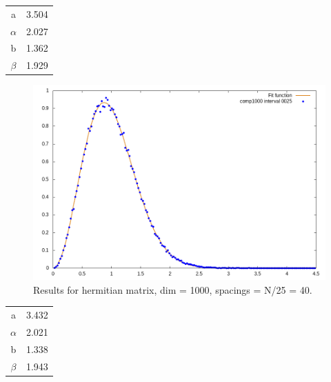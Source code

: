 \documentclass[12pt, a4paper, notitlepage]{report}
\begin{document}
\begin{table}[H]
	\centering
	\begin{tabular}{|c|c|}
		
		\hline
		
		a			& 3.504	\\
		$\alpha$	& 2.027	\\
		b			& 1.362	\\
		$\beta$		& 1.929	\\
		
		\hline
		
	\end{tabular}
\end{table}

\newpage

\begin{figure}[H]
	\centering
	\includegraphics[scale=0.6]{./Comp_1000/hist_interval_0040_fit.png} 
	\caption{Results for hermitian matrix, dim = 1000, spacings = N/25 = 40.}
	\label{figure_lambdas}
\end{figure}

\begin{table}[H]
	\centering
	\begin{tabular}{|c|c|}
		
		\hline
    
		a			& 3.432	\\
		$\alpha$	& 2.021	\\
		b			& 1.338	\\
		$\beta$		& 1.943	\\
		
		\hline
		
	\end{tabular}
\end{table}
\end{document}
